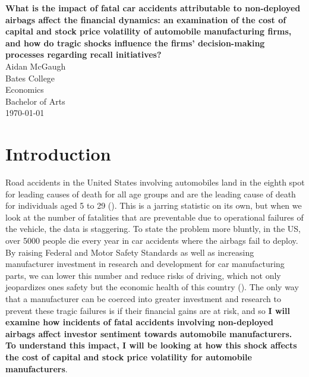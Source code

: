 \documentclass[12pt,a4paper]{article}
\begin{document}
\begin{titlepage}
    \centering
    \vspace*{\fill} %
    \Large \textbf{What is the impact of fatal car accidents attributable to non-deployed airbags affect the financial dynamics: an examination of the cost of capital and stock price volatility of automobile manufacturing firms, and how do tragic shocks influence the firms' decision-making processes regarding recall initiatives?} \\
    \vspace{1.5cm} %
    \large Aidan McGaugh \\
    \vspace{1.5cm} %
    \normalsize Bates College \\
    Economics \\
    Bachelor of Arts \\
    \vspace{1.5cm} %
    \today %
    \vspace*{\fill} %
\end{titlepage}

\doublespacing

\section{Introduction}
    \hspace{1cm} Road accidents in the United States involving automobiles land in the eighth spot for leading causes of death for all age groups and are the leading cause of death for individuals aged 5 to 29 (\cite{WHORoadTrafficInjuries}). This is a jarring statistic on its own, but when we look at the number of fatalities that are preventable due to operational failures of the vehicle, the data is staggering. To state the problem more bluntly, in the US, over 5000 people die every year in car accidents where the airbags fail to deploy. By raising Federal and Motor Safety Standards as well as increasing manufacturer investment in research and development for car manufacturing parts, we can lower this number and reduce risks of driving, which not only jeopardizes ones safety but the economic health of this country (\cite{Afghari2020JointModel}). The only way that a manufacturer can be coerced into greater investment and research to prevent these tragic failures is if their financial gains are at risk, and so \textbf{I will examine how incidents of fatal accidents involving non-deployed airbags affect investor sentiment towards automobile manufacturers. To understand this impact, I will be looking at how this shock affects the cost of capital and stock price volatility for automobile manufacturers}. \
    
\end{document}
